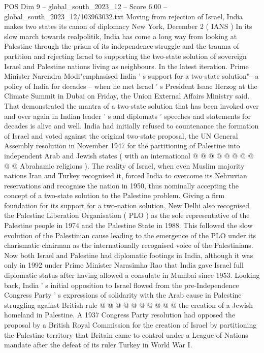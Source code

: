\begin{textsample}{POS Dim 9 – global\_south\_2023\_12 – Score 6.00 – global\_south\_2023\_12/103963032.txt}  \label{ex:f9_pos_004}
Moving from rejection of Israel, India makes two states its canon of diplomacy New York, December 2 ( IANS ) In its slow march towards realpolitik, India has come a long way from looking at Palestine through the prism of its independence struggle and the trauma of partition and rejecting Israel to supporting the two-state solution of sovereign Israel and Palestine nations living as neighbours.
In the latest iteration.
Prime Minister Narendra Modi"emphasised India ' s support for a two-state solution"-- a policy of India for decades -- when he met Israel ' s President Isaac Herzog at the Climate Summit in Dubai on Friday, the Union External Affairs Ministry said.
That demonstrated the mantra of a two-state solution that has been invoked over and over again in Indian leader ' s and diplomats ' speeches and statements for decades is alive and well.
India had initially refused to countenance the formation of Israel and voted against the original two-state proposal, the UN General Assembly resolution in November 1947 for the partitioning of Palestine into independent Arab and Jewish states ( with an international @ @ @ @ @ @ @ @ @ @ Abrahamic religions ).
The reality of Israel, when even Muslim majority nations Iran and Turkey recognised it, forced India to overcome its Nehruvian reservations and recognise the nation in 1950, thus nominally accepting the concept of a two-state solution to the Palestine problem.
Giving a firm foundation for its support for a two-nation solution, New Delhi also recognised the Palestine Liberation Organisation ( PLO ) as the sole representative of the Palestine people in 1974 and the Palestine State in 1988.
This followed the slow evolution of the Palestinian cause leading to the emergence of the PLO under its charismatic chairman as the internationally recognised voice of the Palestinians.
Now both Israel and Palestine had diplomatic footings in India, although it was only in 1992 under Prime Minister Narasimha Rao that India gave Israel full diplomatic status after having allowed a consulate in Mumbai since 1953.
Looking back, India ' s initial opposition to Israel flowed from the pre-Independence Congress Party ' s expressions of solidarity with the Arab cause in Palestine struggling against British rule @ @ @ @ @ @ @ @ @ @ the creation of a Jewish homeland in Palestine.
A 1937 Congress Party resolution had opposed the proposal by a British Royal Commission for the creation of Israel by partitioning the Palestine territory that Britain came to control under a League of Nations mandate after the defeat of its ruler Turkey in World War I.

\end{textsample}
